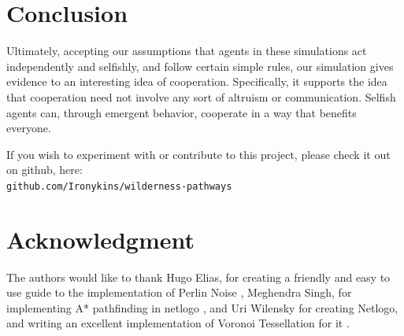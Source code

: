 \documentclass[conference]{IEEEtran}
\begin{document}




\section{Conclusion}
	Ultimately, accepting our assumptions that agents in these simulations act independently and selfishly, and follow certain simple rules, our simulation gives evidence to an interesting idea of cooperation. Specifically, it supports the idea that cooperation need not involve any sort of altruism or communication. Selfish agents can, through emergent behavior, cooperate in a way that benefits everyone.

	If you wish to experiment with or contribute to this project, please check it out on github, here: \\
\verb+github.com/Ironykins/wilderness-pathways+




\section*{Acknowledgment}

The authors would like to thank Hugo Elias, for creating a friendly and easy to use guide to the implementation of Perlin Noise \cite{elias:perlin}, Meghendra Singh, for implementing A* pathfinding in netlogo \cite{singh:astar}, and Uri Wilensky for creating Netlogo, and writing an excellent implementation of Voronoi Tessellation for it \cite{wilensky:voronoi} \cite{wilensky:netlogo}.


\end{document}
